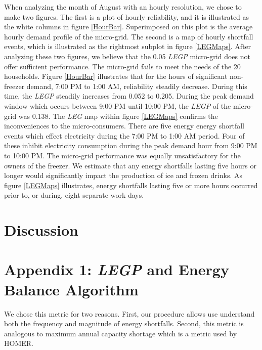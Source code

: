 \documentclass{article}
\begin{document}
When analyzing the month of August with an hourly resolution, we chose to make two figures. 
The first is a plot of hourly reliability, and it is illustrated as the white columns in figure \ref{HourBar}. Superimposed on this plot is the average hourly demand profile of the micro-grid.
The second is a map of hourly shortfall events, which is illustrated as the rightmost subplot in figure \ref{LEGMaps}.
After analyzing these two figures, we believe that the 0.05 \emph{LEGP} micro-grid does not offer sufficient performance.
The micro-grid fails to meet the needs of the 20 households.
Figure \ref{HourBar} illustrates that for the hours of significant non-freezer demand, 7:00 PM to 1:00 AM, reliability steadily decrease. 
During this time, the \emph{LEGP} steadily increases from 0.052 to 0.205. 
During the peak demand window which occurs between 9:00 PM until 10:00 PM, the \emph{LEGP} of the micro-grid was 0.138.
The \emph{LEG} map within figure \ref{LEGMaps} confirms the inconveniences to the micro-consumers.
There are five energy energy shortfall events which effect electricity during the 7:00 PM to 1:00 AM period.
Four of these inhibit electricity consumption during the peak demand hour from 9:00 PM to 10:00 PM.
The micro-grid performance was equally unsatisfactory for the owners of the freezer.
We estimate that any energy shortfalls lasting five hours or longer would significantly impact the production of ice and frozen drinks. 
As figure \ref{LEGMaps} illustrates, energy shortfalls lasting five or more hours occurred prior to, or during, eight separate work days.

 


\section{Discussion}

\appendix	
\section{Appendix 1: \emph{LEGP} and Energy Balance Algorithm} \label{A1}

We chose this metric for two reasons.
First, our procedure allows use understand both the frequency and magnitude of energy shortfalls. 
Second, this metric is analogous to maximum annual capacity shortage which is a metric used by HOMER.
\end{document}
